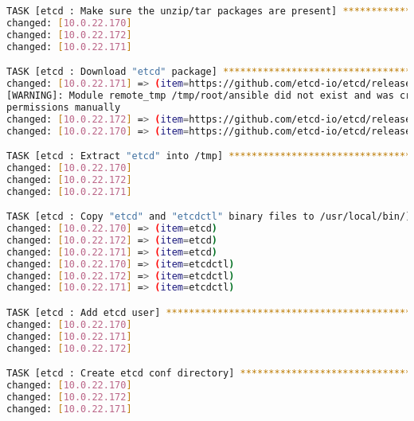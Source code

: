 \begin{flushleft}
\begin{lstlisting}[language=bash, caption=Deploy - Anhang - Deployt,captionpos=b,label={lst:deploy-appendix-deployt},breaklines=true]
TASK [etcd : Make sure the unzip/tar packages are present] ********************************************************************************************************************************************************
changed: [10.0.22.170]
changed: [10.0.22.172]
changed: [10.0.22.171]

TASK [etcd : Download "etcd" package] *****************************************************************************************************************************************************************************
changed: [10.0.22.171] => (item=https://github.com/etcd-io/etcd/releases/download/v3.5.11/etcd-v3.5.11-linux-amd64.tar.gz)
[WARNING]: Module remote_tmp /tmp/root/ansible did not exist and was created with a mode of 0700, this may cause issues when running as another user. To avoid this, create the remote_tmp dir with the correct
permissions manually
changed: [10.0.22.172] => (item=https://github.com/etcd-io/etcd/releases/download/v3.5.11/etcd-v3.5.11-linux-amd64.tar.gz)
changed: [10.0.22.170] => (item=https://github.com/etcd-io/etcd/releases/download/v3.5.11/etcd-v3.5.11-linux-amd64.tar.gz)

TASK [etcd : Extract "etcd" into /tmp] ****************************************************************************************************************************************************************************
changed: [10.0.22.170]
changed: [10.0.22.172]
changed: [10.0.22.171]

TASK [etcd : Copy "etcd" and "etcdctl" binary files to /usr/local/bin/] *******************************************************************************************************************************************
changed: [10.0.22.170] => (item=etcd)
changed: [10.0.22.172] => (item=etcd)
changed: [10.0.22.171] => (item=etcd)
changed: [10.0.22.170] => (item=etcdctl)
changed: [10.0.22.172] => (item=etcdctl)
changed: [10.0.22.171] => (item=etcdctl)

TASK [etcd : Add etcd user] ***************************************************************************************************************************************************************************************
changed: [10.0.22.170]
changed: [10.0.22.171]
changed: [10.0.22.172]

TASK [etcd : Create etcd conf directory] **************************************************************************************************************************************************************************
changed: [10.0.22.170]
changed: [10.0.22.172]
changed: [10.0.22.171]


\end{lstlisting}
\end{flushleft}
